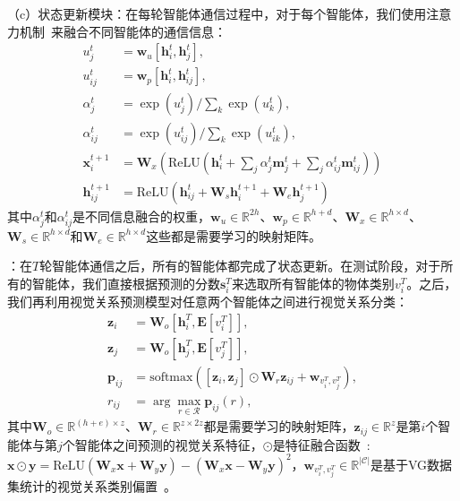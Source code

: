 （c）状态更新模块：在每轮智能体通信过程中，对于每个智能体，我们使用注意力机制~\cite{chen2017sca}来融合不同智能体的通信信息：
\begin{equation}
\begin{aligned}
    u^t_j &= \bm{w}_u [\bm{h}^t_i, \bm{h}^t_j], \\ 
    u^t_{ij} &= \bm{w}_p [\bm{h}^t_i, \bm{h}^t_{ij}], \\
    \alpha^t_j & = \exp(u^t_j) / \textstyle{\sum_k} \exp(u^t_k), \\
    \alpha^t_{ij} & = \exp(u^t_{ij}) / \textstyle{\sum_k} \exp(u^t_{ik}), \\
    \bm{x}^{t+1}_i &= \bm{W}_x (\text{ReLU} (\bm{h}^t_i + \textstyle{\sum_j} \alpha^t_j \bm{m}^t_j +  \textstyle{\sum_j} \alpha^t_{ij} \bm{m}^t_{ij})) \\
    \bm{h}^{t+1}_{ij} &= \text{ReLU} (\bm{h}^t_{ij} + \bm{W}_s \bm{h}^{t+1}_i + \bm{W}_e \bm{h}^{t+1}_j)
\end{aligned}
\end{equation}
其中$\alpha^t_j$和$\alpha^t_{ij}$是不同信息融合的权重，$\bm{w}_u \in \mathbb{R}^{2h}$、$\bm{w}_p \in \mathbb{R}^{h+d}$、$\bm{W}_x \in \mathbb{R}^{h\times d}$、$\bm{W}_s \in \mathbb{R}^{h\times d}$和$\bm{W}_e \in \mathbb{R}^{h\times d}$这些都是需要学习的映射矩阵。


\textbf{}：在$T$轮智能体通信之后，所有的智能体都完成了状态更新。在测试阶段，对于所有的智能体，我们直接根据预测的分数$\bm{s}^T_i$来选取所有智能体的物体类别$v^T_i$。之后，我们再利用视觉关系预测模型对任意两个智能体之间进行视觉关系分类：
\begin{equation}
\begin{aligned}
    \bm{z}_i & = \bm{W}_o [\bm{h}^T_i, \mathbf{E}[v^T_i]], \\
    \bm{z}_j & = \bm{W}_o [\bm{h}^T_j, \mathbf{E}[v^T_j]], \\
    \bm{p}_{ij} & = \text{softmax} ([\bm{z}_i,  \bm{z}_j] \odot \bm{W}_r \bm{z}_{ij} + \bm{w}_{v^T_i, v^T_j}), \\
    r_{ij} & = \arg \textstyle{\max_{r \in \mathcal{R}}} \bm{p}_{ij}(r),
\end{aligned}
\end{equation}
其中$\bm{W}_o \in \mathbb{R}^{(h+e) \times z}$、$\bm{W}_r \in \mathbb{R}^{z\times 2z}$都是需要学习的映射矩阵，$\bm{z}_{ij} \in \mathbb{R}^z$是第$i$个智能体与第$j$个智能体之间预测的视觉关系特征，$\odot$是特征融合函数~\cite{zhang2018learning}: $\bm{x} \odot \bm{y} = \text{ReLU}(\bm{W}_x \bm{x} + \bm{W}_y \bm{y}) - (\bm{W}_x \bm{x} - \bm{W}_y \bm{y})^2$，$\bm{w}_{v^T_i, v^T_j} \in \mathbb{R}^{|\mathcal{C}|}$是基于VG数据集统计的视觉关系类别偏置~\cite{zellers2018neural}。 


